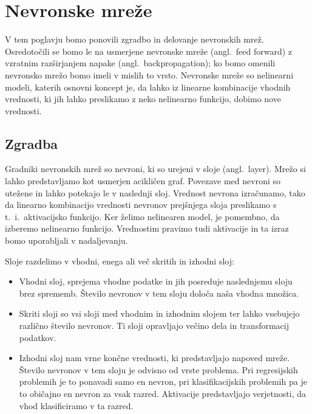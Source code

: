 \chapter{Nevronske mreže}
V tem poglavju bomo ponovili zgradbo in delovanje nevronskih mrež. Osredotočili se bomo le na  usmerjene nevronske mreže (angl.\ feed forward) z vzratnim razširjanjem napake (angl.\ backpropagation); ko bomo omenili nevronsko mrežo bomo imeli v mislih to vrsto.
Nevronske mreže so nelinearni modeli, katerih osnovni koncept je, da lahko iz linearne kombinacije vhodnih vrednosti, ki jih lahko preslikamo z neko nelinearno funkcijo, dobimo nove vrednosti.~\cite{Hastie2009}


\section{Zgradba}
Gradniki nevronskih mrež so nevroni, ki so urejeni v sloje (angl.\ layer).
Mrežo si lahko predstavljamo kot usmerjen acikličen graf. Povezave med nevroni so utežene in lahko potekajo le v naslednji sloj.
Vrednost nevrona izračunamo, tako da linearno kombinacijo vrednosti nevronov prejšnjega sloja preslikamo s t.\ i.\ aktivacijsko funkcijo. Ker želimo nelinearen model, je pomembno, da izberemo nelinearno funkcijo. Vrednostim pravimo tudi aktivacije in ta izraz bomo uporabljali v nadaljevanju.

Sloje razdelimo v vhodni, enega ali več skritih in izhodni sloj:
\begin{itemize}
    \item Vhodni sloj, sprejema vhodne podatke in jih posreduje naslednjemu sloju brez sprememb. Število nevronov v tem sloju določa naša vhodna množica.
    \item Skriti sloji so vsi sloji med vhodnim in izhodnim slojem ter lahko vsebujejo različno število nevronov. Ti sloji opravljajo večino dela in transformacij podatkov.
    \item Izhodni sloj nam vrne končne vrednosti, ki predstavljajo napoved mreže. Število nevronov v tem sloju je odvisno od vrste problema. Pri regresijskih problemih je to ponavadi samo en nevron, pri klasifikacijskih problemih pa je to običajno en nevron za vsak razred. Aktivacije predstavljajo verjetnosti, da vhod klasificiramo v ta razred.
\end{itemize}


